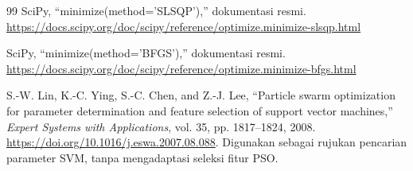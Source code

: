 \begin{thebibliography}{99}
 SciPy, ``minimize(method='SLSQP'),'' dokumentasi resmi. \url{https://docs.scipy.org/doc/scipy/reference/optimize.minimize-slsqp.html}

 SciPy, ``minimize(method='BFGS'),'' dokumentasi resmi. \url{https://docs.scipy.org/doc/scipy/reference/optimize.minimize-bfgs.html}

 S.-W. Lin, K.-C. Ying, S.-C. Chen, and Z.-J. Lee, ``Particle swarm optimization for parameter determination and feature selection of support vector machines,'' \emph{Expert Systems with Applications}, vol. 35, pp. 1817--1824, 2008. \url{https://doi.org/10.1016/j.eswa.2007.08.088}. Digunakan sebagai rujukan pencarian parameter SVM, tanpa mengadaptasi seleksi fitur PSO.



\end{thebibliography}
